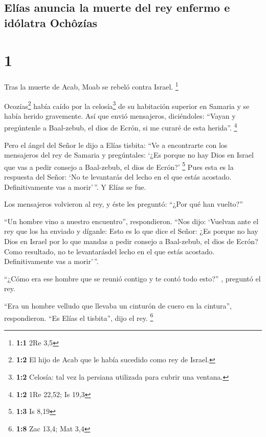 \hypertarget{eluxedas-anuncia-la-muerte-del-rey-enfermo-e-iduxf3latra-ochuxf4zuxedas}{%
\subsection{Elías anuncia la muerte del rey enfermo e idólatra
Ochôzías}\label{eluxedas-anuncia-la-muerte-del-rey-enfermo-e-iduxf3latra-ochuxf4zuxedas}}

\hypertarget{section}{%
\section{1}\label{section}}

 Tras la muerte de Acab, Moab se rebeló contra Israel.
\footnote{\textbf{1:1} 2Re 3,5}

 Ocozías\footnote{\textbf{1:2} El hijo de Acab que le
  había sucedido como rey de Israel.} había caído por la
celosía\footnote{\textbf{1:2} Celosía: tal vez la persiana utilizada
  para cubrir una ventana.} de su habitación superior en Samaria y se
había herido gravemente. Así que envió mensajeros, diciéndoles: ``Vayan
y pregúntenle a Baal-zebub, el dios de Ecrón, si me curaré de esta
herida''. \footnote{\textbf{1:2} 1Re 22,52; Is 19,3}

 Pero el ángel del Señor le dijo a Elías tisbita: ``Ve a
encontrarte con los mensajeros del rey de Samaria y pregúntales: `¿Es
porque no hay Dios en Israel que vas a pedir consejo a Baal-zebub, el
dios de Ecrón?' \footnote{\textbf{1:3} Is 8,19}  Pues esta
es la respuesta del Señor: `No te levantarás del lecho en el que estás
acostado. Definitivamente vas a morir'\,''. Y Elías se fue.

 Los mensajeros volvieron al rey, y éste les preguntó:
``¿Por qué han vuelto?''

 ``Un hombre vino a nuestro encuentro'', respondieron.
``Nos dijo: `Vuelvan ante el rey que los ha enviado y díganle: Esto es
lo que dice el Señor: ¿Es porque no hay Dios en Israel por lo que mandas
a pedir consejo a Baal-zebub, el dios de Ecrón? Como resultado, no te
levantarásdel lecho en el que estás acostado. Definitivamente vas a
morir'\,''.

 ``¿Cómo era ese hombre que se reunió contigo y te contó
todo esto?'' , preguntó el rey.

 ``Era un hombre velludo que llevaba un cinturón de cuero
en la cintura'', respondieron. ``Es Elías el tisbita'', dijo el rey.
\footnote{\textbf{1:8} Zac 13,4; Mat 3,4}


